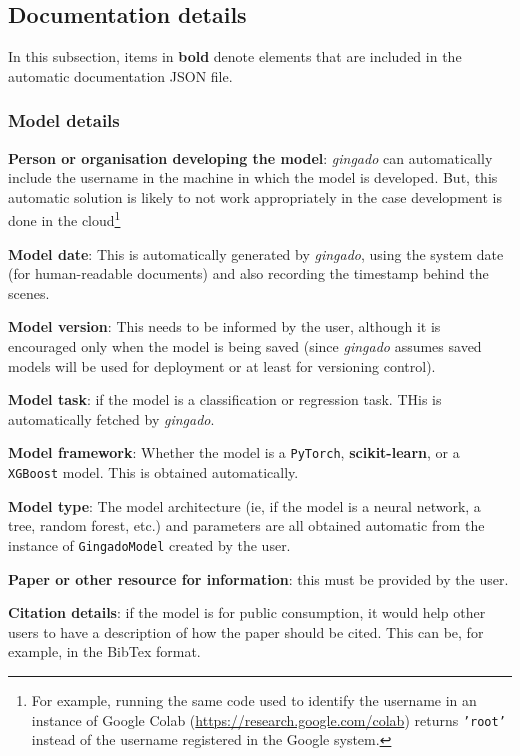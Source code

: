 \documentclass{article}
\begin{document}

\subsection{Documentation details}

In this subsection, items in \textbf{bold} denote elements that are included in the automatic documentation JSON file.

\subsubsection{Model details}

\textbf{Person or organisation developing the model}: \textit{gingado} can automatically include the username in the machine in which the model is developed. But, this automatic solution is likely to not work appropriately in the case development is done in the cloud\footnote{For example, running the same code used to identify the username in an instance of Google Colab (\url{https://research.google.com/colab}) returns \texttt{'root'} instead of the username registered in the Google system.}

\textbf{Model date}: This is automatically generated by \textit{gingado}, using the system date (for human-readable documents) and also recording the timestamp behind the scenes.

\textbf{Model version}: This needs to be informed by the user, although it is encouraged only when the model is being saved (since \textit{gingado} assumes saved models will be used for deployment or at least for versioning control).

\textbf{Model task}: if the model is a classification or regression task. THis is automatically fetched by \textit{gingado}.

\textbf{Model framework}: Whether the model is a \texttt{PyTorch}, \textbf{scikit-learn}, or a \texttt{XGBoost} model. This is obtained automatically.

\textbf{Model type}: The model architecture (ie, if the model is a neural network, a tree, random forest, etc.) and parameters are all obtained automatic from the instance of \texttt{GingadoModel} created by the user.

\textbf{Paper or other resource for information}: this must be provided by the user.

\textbf{Citation details}: if the model is for public consumption, it would help other users to have a description of how the paper should be cited. This can be, for example, in the BibTex format.
\end{document}
